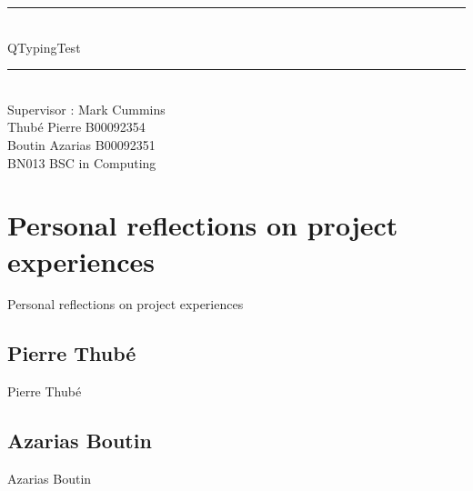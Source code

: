 \documentclass[12pt]{report}
\newcommand{\Mline}{\hrule \mbox{}\\[0.1cm]}
\begin{document}
\begin{titlepage}
\begin{center}


\Mline
{ \LARGE QTypingTest \\[0.4cm] }
\Mline

\textsf{Supervisor : Mark Cummins}\\[3cm]

\textsf{Thubé Pierre B00092354\\
	Boutin Azarias B00092351\\[2cm]
	BN013 BSC in Computing}

\end{center}
\end{titlepage}

\setcounter{page}{2}

\tableofcontents







\part{Personal reflections on project experiences}
Personal reflections on project experiences

\chapter{Pierre Thubé}
Pierre Thubé

\chapter{Azarias Boutin}
Azarias Boutin
\end{document}
